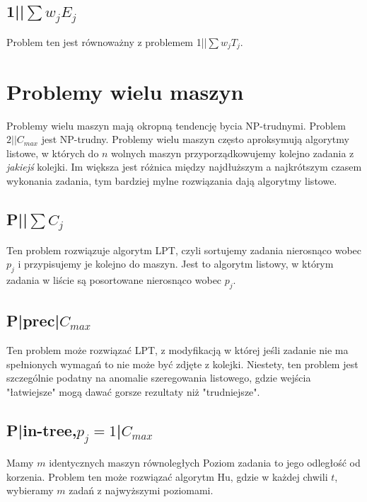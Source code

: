 \documentclass{../notatki}
\begin{document}
\subsection{1||\texorpdfstring{$\sum w_jE_j$}{sum wjEj}}

Problem ten jest równoważny z problemem 1||$\sum w_jT_j$.

\section{Problemy wielu maszyn}

Problemy wielu maszyn mają okropną tendencję bycia NP-trudnymi. Problem
$2||C_{max}$ jest NP-trudny. Problemy wielu maszyn często aproksymują algorytmy
listowe, w których do $n$ wolnych maszyn przyporządkowujemy kolejno zadania
z \textit{jakiejś} kolejki. Im większa jest różnica między
najdłuższym a najkrótszym czasem wykonania zadania, tym bardziej
mylne rozwiązania dają algorytmy listowe.

\subsection{P||\texorpdfstring{$\sum C_j$}{sum Cj}}

Ten problem rozwiązuje algorytm LPT, czyli sortujemy zadania nierosnąco
wobec $p_j$ i przypisujemy je kolejno do maszyn. Jest to algorytm
listowy, w którym zadania w liście są posortowane nierosnąco
wobec $p_j$.

\subsection{P|prec|\texorpdfstring{$C_{max}$}{Cmax}}

Ten problem może rozwiązać LPT, z modyfikacją w której jeśli zadanie nie ma
spełnionych wymagań to nie może być zdjęte z kolejki. Niestety, ten problem
jest szczególnie podatny na anomalie szeregowania listowego, gdzie wejścia
"łatwiejsze" mogą dawać gorsze rezultaty niż "trudniejsze".

\subsection{P|in-tree,\texorpdfstring{$p_j =
1$}{pj=1}|\texorpdfstring{$C_{max}$}{Cmax}}

Mamy $m$ identycznych maszyn równoległych
Poziom zadania to jego odległość od korzenia. Problem ten może rozwiązać
algorytm Hu, gdzie w każdej chwili $t$, wybieramy $m$ zadań z najwyższymi
poziomami.
\end{document}
